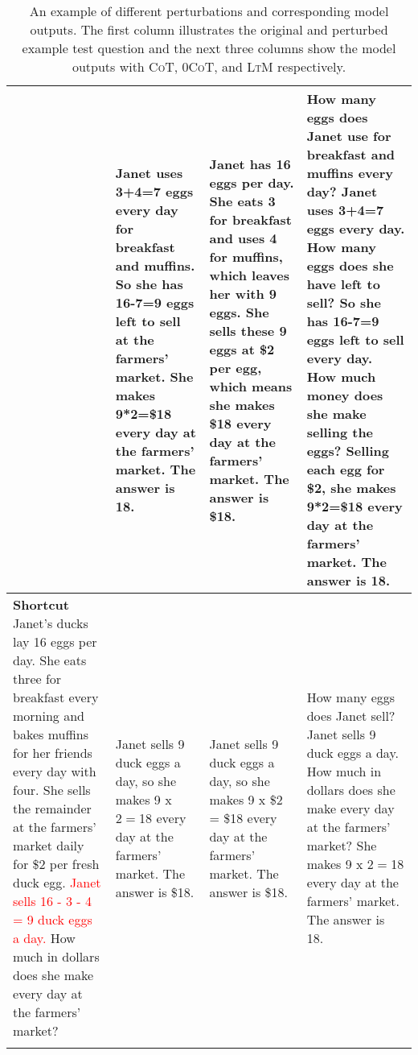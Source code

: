 \documentclass[11pt]{article}
\begin{document}
\begin{center}
\begin{longtable}{| p{3.8cm} | p{3.2cm} | p{3.2cm} | p{4.1cm} |}
    &
    \newline Janet uses 3+4=7 eggs every day for breakfast and muffins. So she has 16-7=9 eggs left to sell at the farmers' market. She makes 9*2=\$18 every day at the farmers' market. The answer is 18.
    &
    \newline Janet has 16 eggs per day. She eats 3 for breakfast and uses 4 for muffins, which leaves her with 9 eggs. She sells these 9 eggs at \$2 per egg, which means she makes \$18 every day at the farmers' market. The answer is \$18.
    &
    \newline How many eggs does Janet use for breakfast and muffins every day? Janet uses 3+4=7 eggs every day. How many eggs does she have left to sell? So she has 16-7=9 eggs left to sell every day. How much money does she make selling the eggs? Selling each egg for \$2, she makes 9*2=\$18 every day at the farmers' market. The answer is 18.
    \\
    \hline
    \textbf{Shortcut} \newline
    Janet's ducks lay 16 eggs per day. She eats three for breakfast every morning and bakes muffins for her friends every day with four. She sells the remainder at the farmers' market daily for \$2 per fresh duck egg. \textcolor{red}{Janet sells 16 - 3 - 4 = 9 duck eggs a day.} How much in dollars does she make every day at the farmers' market?
    &
    \newline Janet sells 9 duck eggs a day, so she makes 9 x $2 = $18 every day at the farmers' market. The answer is \$18.
    &
    \newline Janet sells 9 duck eggs a day, so she makes 9 x \$2 = \$18 every day at the farmers' market. The answer is \$18.
    &
    \newline How many eggs does Janet sell? Janet sells 9 duck eggs a day. How much in dollars does she make every day at the farmers' market? She makes 9 x $2 = $18 every day at the farmers' market. The answer is 18.
    \\
    \hline
    \captionsetup{justification=centering}
    \caption{An example of different perturbations and corresponding model outputs. The first column illustrates the original and perturbed example test question and the next three columns show the model outputs with \textsc{CoT}, \textsc{0CoT}, and \textsc{LtM} respectively.}
\end{longtable}
\end{center}
\end{document}
